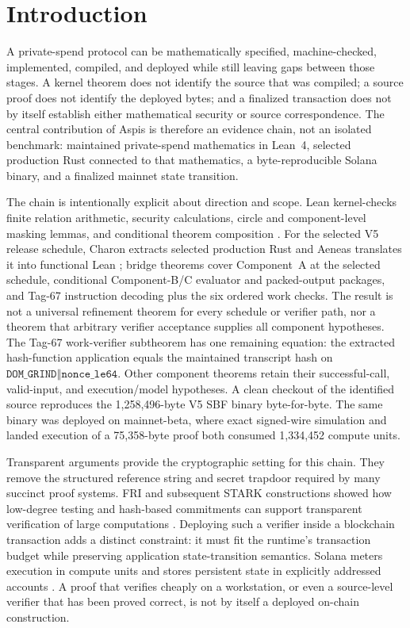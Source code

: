 \section{Introduction}\label{sec:introduction}

A private-spend protocol can be mathematically specified, machine-checked,
implemented, compiled, and deployed while still leaving gaps between those
stages.  A kernel theorem does not identify the source that was compiled; a
source proof does not identify the deployed bytes; and a finalized transaction
does not by itself establish either mathematical security or source
correspondence.  The central contribution of Aspis is therefore an evidence
chain, not an isolated benchmark: maintained private-spend mathematics in
Lean~4, selected production Rust connected to that mathematics, a
byte-reproducible Solana binary, and a finalized mainnet state transition.

The chain is intentionally explicit about direction and scope.  Lean
kernel-checks finite relation arithmetic, security calculations, circle and
component-level masking lemmas, and conditional theorem composition
\cite{deMouraUllrich2021Lean4}.  For the selected V5 release schedule, Charon
extracts selected production Rust and Aeneas translates it into functional
Lean \cite{HoProtzenko2022Aeneas}; bridge theorems cover Component~A at the
selected schedule, conditional Component-B/C evaluator and packed-output
packages, and Tag-67 instruction decoding plus the six ordered work checks.
The result is not a universal refinement theorem for every schedule or
verifier path, nor a theorem that arbitrary verifier acceptance supplies all
component hypotheses.  The Tag-67 work-verifier subtheorem has one remaining
equation: the extracted hash-function application equals the maintained
transcript hash on
\(\texttt{DOM\_GRIND}\mathbin\Vert\texttt{nonce\_le64}\).  Other component
theorems retain their successful-call, valid-input, and execution/model
hypotheses.  A clean checkout of
the identified source reproduces the 1,258,496-byte V5 SBF binary
byte-for-byte.  The same binary was deployed on mainnet-beta, where exact
signed-wire simulation and landed execution of a 75,358-byte proof both
consumed 1,334,452 compute units.

Transparent arguments provide the cryptographic setting for this chain.  They
remove the structured reference string and secret trapdoor required by many
succinct proof systems.  FRI and subsequent STARK constructions showed how
low-degree testing and hash-based commitments can support transparent
verification of large computations
\cite{BenSassonBentovHoreshRiabzev2018FRI,
BenSassonBentovHoreshRiabzev2018STARK}.  Deploying such a verifier inside a
blockchain transaction adds a distinct constraint: it must fit the runtime's
transaction budget while preserving application state-transition semantics.
Solana meters execution in compute units and stores persistent state in
explicitly addressed accounts \cite{SolanaComputeBudget,SolanaAccounts}.  A
proof that verifies cheaply on a workstation, or even a source-level verifier
that has been proved correct, is not by itself a deployed on-chain
construction.

